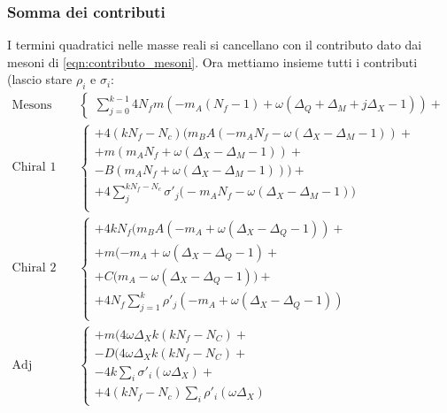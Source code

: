 \documentclass[a4paper,12pt]{article}
\begin{document}
\subsubsection{Somma dei contributi}


I termini quadratici nelle masse reali si cancellano con il contributo dato dai mesoni di \ref{eqn:contributo_mesoni}.
Ora mettiamo insieme tutti i contributi (lascio stare $\rho_i$ e $\sigma_i$:
\begin{align*}
\mbox{Mesons}  &\begin{cases}
\sum_{j=0}^{k-1} 4 N_f   m (- m_A (N_f - 1)  + \omega( \Delta_Q +  \Delta_M + j \Delta_X -1  )  ) + 
\end{cases}
\\
\mbox{Chiral 1}& \begin{cases}
+  4 ( k N_f - N_c ) \big(  m_B A (  -  m_A N_f - \omega( \Delta_X - \Delta_M - 1)) +\\
 +  m ( m_A N_f + \omega( \Delta_X - \Delta_M - 1)) + \\ 
   -   B ( m_A N_f + \omega( \Delta_X - \Delta_M - 1)) \big) +\\
   +  4 \sum_j^{k N_f - N_c} \sigma'_j \big( - m_A N_f -  \omega( \Delta_X - \Delta_M - 1) \big) \\
\end{cases}\\
\mbox{Chiral 2} & \begin{cases}
  +    4 k N_f \big(  m_B A (- m_A +  \omega ( \Delta_X - \Delta_Q - 1)) + \\
  +  m ( - m_A +  \omega ( \Delta_X - \Delta_Q - 1)+ \\
+ C ( m_A - \omega ( \Delta_X - \Delta_Q - 1) \big) + \\
+  4 N_f \sum_{j=1}^k  \rho'_j ( - m_A +  \omega ( \Delta_X - \Delta_Q - 1) ) \\
\end{cases}\\
\mbox{Adj matter} & \begin{cases}
	+ m( 4 \omega \Delta_X k ( k N_f - N_C) +\\
	- D ( 4 \omega \Delta_X k ( kN_f - N_C) + \\
	- 4 k \sum_i \sigma'_i (  \omega \Delta_X ) + \\
	+ 4 (k N_f - N_c)  \sum_i \rho'_i(  \omega \Delta_X ) 
\end{cases}
\end{align*}
\end{document}
